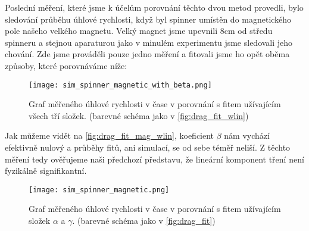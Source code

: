 \clearpage

Poslední měření, které jsme k účelům porovnání těchto dvou metod provedli, bylo sledování průběhu úhlové rychlosti, když byl spinner umístěn do magnetického pole našeho velkého magnetu. Velký magnet jsme upevnili 8cm od středu spinneru a stejnou aparaturou jako v minulém experimentu jsme sledovali jeho chování. Zde jsme prováděli pouze jedno měření a fitovali jsme ho opět oběma způsoby, které porovnáváme níže:
\begin{figure}[H]
    \texttt{[image: sim\_spinner\_magnetic\_with\_beta.png]}
    \centering
    \caption[Příklad grafu měřeného průběhu $\omega$ v $t$ s $\beta \neq 0$ v magnetickém poli]{Graf měřeného úhlové rychlosti v čase v porovnání s fitem užívajícím všech tří složek. (barevné schéma jako v \autoref{fig:drag_fit_wlin})}
    \label{fig:drag_fit_mag_wlin}
\end{figure}
Jak můžeme vidět na \autoref{fig:drag_fit_mag_wlin}, koeficient $\beta$ nám vychází efektivně nulový a průběhy fitů, ani simulací, se od sebe téměř neliší.
Z těchto měření tedy ověřujeme naši předchozí představu, že lineární komponent tření není fyzikálně signifikantní.
\begin{figure}[H]
    \texttt{[image: sim\_spinner\_magnetic.png]}
    \centering
    \caption[Příklad grafu měřeného průběhu $\omega$ v $t$ s $\beta = 0$ v magnetickém poli]{Graf měřeného úhlové rychlosti v čase v porovnání s fitem užívajícím složek $\alpha$ a $\gamma$. (barevné schéma jako v \autoref{fig:drag_fit})}
    \label{fig:drag_fit_mag}
\end{figure}

